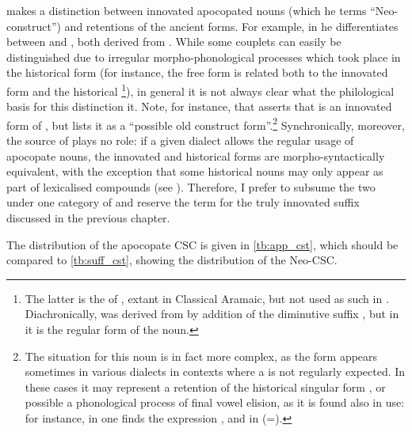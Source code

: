 \textcites[3, fn.\ 15]{MutzafiBarzani}[92]{MutzafiBetanure}  makes a distinction between innovated apocopated \cst* nouns (which he terms \enquote{Neo-construct}) and retentions of the ancient \cst* forms. For example, in \Betn he differentiates between  and , both derived from  \citep[92]{MutzafiBetanure}. While some couplets can easily be distinguished due to irregular morpho-phonological processes which took place in the historical form (for instance, the free form  is related both to the innovated \cst* form  and the historical \cst* {}\footnote{The latter is the \cst* of , extant in Classical Aramaic, but not used as such in . Diachronically,  was derived from  by addition of the diminutive suffix , but in  it is the regular form of the noun.}), in general it is not always clear what the philological basis for this distinction it. Note, for instance, that \citet[3, fn.\ 15]{MutzafiBarzani} asserts that  is an innovated \cst* form of , but \citet[92]{MutzafiBetanure} lists it as a \enquote{possible old construct form}.\footnote{The situation for this noun is in fact more complex, as the form  appears sometimes in various dialects in contexts where a \cst* is not regularly expected. In these cases it may represent a retention of the historical  singular form \citep[173]{KhanArbel}, or possible a phonological process of final vowel elision, as it is found also in \pl* use: for instance, in \Arb one finds the expression  \citep[229 {[B:13]}]{KhanArbel}, and in \JZax {} \citep[117 (112)]{CohenZakho} (=).} Synchronically, moreover, the source of  plays no role: if a given dialect allows the regular usage of apocopate \cst* nouns, the innovated and historical forms are morpho-syntactically equivalent, with the exception that some historical \cst* nouns may only appear as part of lexicalised compounds (see ). Therefore, I prefer to subsume the two under one category of  and reserve the term  for the truly innovated suffix \ed discussed in the previous chapter.

The distribution of the apocopate CSC is given in \ref{tb:app_cst}, which should be compared to \vref{tb:suff_cst}, showing the distribution of the Neo-CSC.

